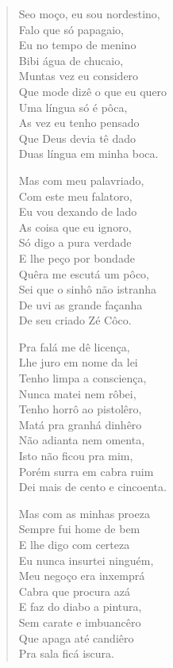 \begin{verse}
Seo moço, eu sou nordestino,\\
Falo que só papagaio,\\
Eu no tempo de menino\\
Bibi água de chucaio,\\
Muntas vez eu considero\\
Que mode dizê o que eu quero\\
Uma língua só é pôca,\\
As vez eu tenho pensado\\
Que Deus devia tê dado\\
Duas língua em minha boca.

Mas com meu palavriado,\\
Com este meu falatoro,\\
Eu vou dexando de lado\\
As coisa que eu ignoro,\\
Só digo a pura verdade\\
E lhe peço por bondade\\
Quêra me escutá um pôco,\\
Sei que o sinhô não istranha\\
De uvi as grande façanha\\
De seu criado Zé Côco.

Pra falá me dê licença,\\
Lhe juro em nome da lei\\
Tenho limpa a consciença,\\
Nunca matei nem rôbei,\\
Tenho horrô ao pistolêro,\\
Matá pra granhá dinhêro\\
Não adianta nem omenta,\\
Isto não ficou pra mim,\\
Porém surra em cabra ruim\\
Dei mais de cento e cincoenta.

Mas com as minhas proeza\\
Sempre fui home de bem\\
E lhe digo com certeza\\
Eu nunca insurtei ninguém,\\
Meu negoço era inxemprá\\
Cabra que procura azá\\
E faz do diabo a pintura,\\
Sem carate e imbuancêro\\
Que apaga até candiêro\\
Pra sala ficá iscura.


\end{verse}
